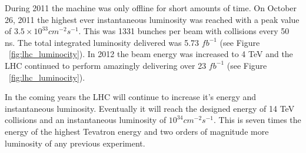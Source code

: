 During 2011 the machine was only offline for short amounts of time.  On October 26, 2011 the highest ever instantaneous luminosity was reached with a peak value of $3.5 \times 10^{33} cm^{-2} s^{-1}$.  This was 1331 bunches per beam with collisions every 50 ns. The total integrated luminosity delivered was 5.73 $fb^{-1}$ (see Figure ~\ref{fig:lhc_luminocity}). In 2012 the beam energy was increased to 4 TeV and the LHC continued to perform amazingly delivering over 23 $fb^{-1}$ (see Figure ~\ref{fig:lhc_luminocity}).

In the coming years the LHC will continue to increase it's energy and instantaneous luminosity.  Eventually it will reach the designed energy of 14 TeV collisions and an instantaneous luminosity of $10^{34} cm^{-2}s^{-1}$.  This is seven times the energy of the highest Tevatron energy and two orders of magnitude more luminosity of any previous experiment.



